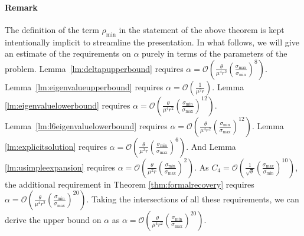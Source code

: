 \documentclass[twoside,11pt]{article}
\newcommand{\mO}{\mathcal{O}}
\newcommand{\gop}{\sigma_{\max}}
\newcommand{\sm}{\sigma_{\min}}
\newcommand{\bcnum}{\left(\frac{\gop}{\sm}\right)}
\newcommand{\invcnum}{\frac{\sm}{\gop}}
\begin{document}
\paragraph{Remark} The definition of the term $\rho_{\min}$ in the statement of the above theorem is kept intentionally implicit to streamline the presentation. In what follows,  we will give an estimate of the requirements on $\alpha$ purely in terms of the parameters of the problem. Lemma~\ref{lm:deltapupperbound} requires $\alpha= \mO \left(\frac{\theta}{\mu^4 r^2}\bcnum^8\right) $. Lemma~\ref{lm:eigenvalueupperbound} requires $\alpha= \mO \left(\frac{1}{\mu^2 r}\right)$.  Lemma \ref{lm:eigenvaluelowerbound} requires $\alpha= \mathcal{O}\left(\frac{\theta}{\mu^4r^2}\left(\invcnum\right)^{12}\right)$. Lemma~\ref{lm:l6eigenvaluelowerbound} requires $\alpha= \mathcal{O}\left(\frac{\theta}{\mu^4r^2}\left(\invcnum\right)^{12}\right)$. Lemma \ref{lm:explicitsolution} requires  $\alpha=\mathcal{O}\left(\frac{\theta}{\mu^2r}\left(\invcnum\right)^6\right)$. And Lemma \ref{lm:usimpleexpansion} requires $\alpha= \mathcal{O}\left(\frac{\theta}{\mu^2r}\left(\invcnum\right)^2\right)$. As $C_4=\mathcal{O}\left(\frac{1}{\sqrt{\theta}}\bcnum^{10}\right)$, the additional requirement in Theorem \ref{thm:formalrecovery} requires $\alpha= \mathcal{O}\left(\frac{\theta}{\mu^4r^2}\left(\invcnum\right)^{20}\right)$. Taking the intersections of all these requirements, we can derive the upper bound on $\alpha$ as $ \alpha = \mathcal{O}\left(\frac{\theta}{\mu^4r^2}\left(\invcnum\right)^{20}\right)$.
\end{document}
